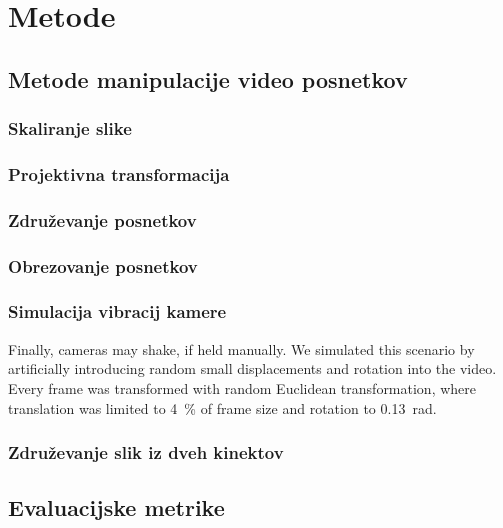 \chapter{Metode}\label{sec:metode}







\section{Metode manipulacije video posnetkov}

\subsection{Skaliranje slike}
\subsection{Projektivna transformacija}
\subsection{Združevanje posnetkov}
\subsection{Obrezovanje posnetkov}
\subsection{Simulacija vibracij kamere}
Finally, cameras may shake, if held manually. We simulated this scenario by artificially introducing random small displacements and rotation into the video. Every frame was transformed with random Euclidean transformation, where translation was limited to \SI{4}{\%} of frame size and rotation to \SI{0.13}{rad}.

\subsection{Združevanje slik iz dveh kinektov}


\section{Evaluacijske metrike}



